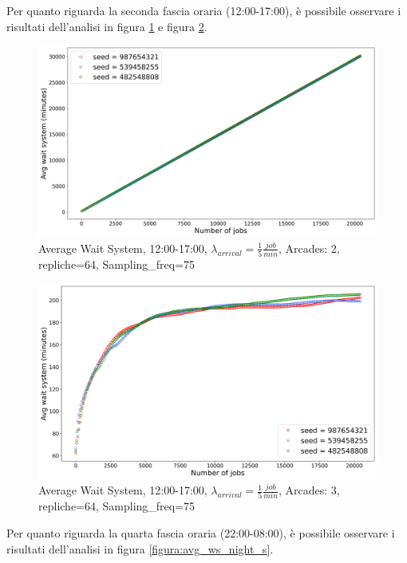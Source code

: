 \documentclass{article}
\begin{document}
Per quanto riguarda la seconda fascia oraria (12:00-17:00), è possibile osservare i risultati dell'analisi in figura \ref{figura:avg_ws_aft_ns} e figura \ref{figura:avg_ws_aft_s}.




\begin{figure}[H]
\centering
\captionsetup{justification=centering,margin=2cm}
\includegraphics[scale=0.48]{images/transient_aft_ns.png}
\caption{Average Wait System, 12:00-17:00, $\lambda_{arrival}=\frac{1}{5} \frac{job}{min}$, Arcades: 2, repliche=64, Sampling\_freq=75}\label{figura:avg_ws_aft_ns}
\end{figure}
\begin{figure}[H]
\centering
\captionsetup{justification=centering,margin=2cm}
\includegraphics[scale=0.48]{images/transient_aft_s.png}
\caption{Average Wait System, 12:00-17:00, $\lambda_{arrival}=\frac{1}{5} \frac{job}{min}$, Arcades: 3, repliche=64, Sampling\_freq=75}\label{figura:avg_ws_aft_s}
\end{figure}


Per quanto riguarda la quarta fascia oraria (22:00-08:00), è possibile osservare i risultati dell'analisi in figura \ref{figura:avg_ws_night_s}.
\end{document}
